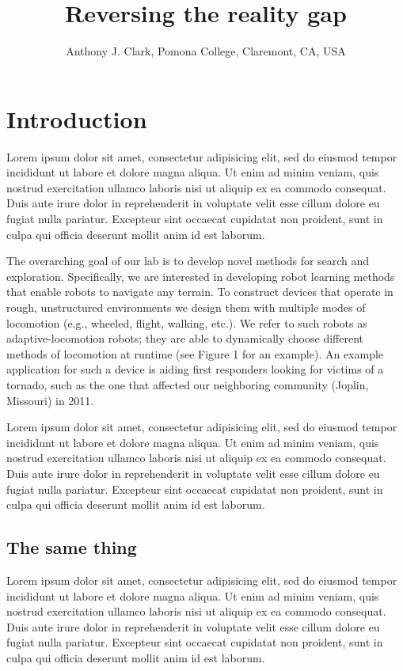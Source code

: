 \documentclass{proposal}
\title{Reversing the reality gap}
\author{Anthony J. Clark, Pomona College, Claremont, CA, USA}
\begin{document}
\maketitle
\thispagestyle{fancy}

\section{Introduction}
Lorem ipsum dolor sit amet, consectetur adipisicing elit, sed do eiusmod
tempor incididunt ut labore et dolore magna aliqua. Ut enim ad minim veniam,
quis nostrud exercitation ullamco laboris nisi ut aliquip ex ea commodo
consequat. Duis aute irure dolor in reprehenderit in voluptate velit esse
cillum dolore eu fugiat nulla pariatur. Excepteur sint occaecat cupidatat non
proident, sunt in culpa qui officia deserunt mollit anim id est laborum.

\begin{callout}
    The overarching goal of our lab is to develop novel methods for search and exploration. Specifically, we are interested in developing robot learning methods that enable robots to navigate any terrain. To construct devices that operate in rough, unstructured environments we design them with multiple modes of locomotion (e.g., wheeled, flight, walking, etc.). We refer to such robots as adaptive-locomotion robots; they are able to dynamically choose different methods of locomotion at runtime (see Figure 1 for an example). An example application for such a device is aiding first responders looking for victims of a tornado, such as the one that affected our neighboring community (Joplin, Missouri) in 2011.
\end{callout}

Lorem ipsum dolor sit amet, consectetur adipisicing elit, sed do eiusmod
tempor incididunt ut labore et dolore magna aliqua. Ut enim ad minim veniam,
quis nostrud exercitation ullamco laboris nisi ut aliquip ex ea commodo
consequat. Duis aute irure dolor in reprehenderit in voluptate velit esse
cillum dolore eu fugiat nulla pariatur. Excepteur sint occaecat cupidatat non
proident, sunt in culpa qui officia deserunt mollit anim id est laborum.

\subsection{The same thing}
Lorem ipsum dolor sit amet, consectetur adipisicing elit, sed do eiusmod
tempor incididunt ut labore et dolore magna aliqua. Ut enim ad minim veniam,
quis nostrud exercitation ullamco laboris nisi ut aliquip ex ea commodo
consequat. Duis aute irure dolor in reprehenderit in voluptate velit esse
cillum dolore eu fugiat nulla pariatur. Excepteur sint occaecat cupidatat non
proident, sunt in culpa qui officia deserunt mollit anim id est laborum.
\end{document}
